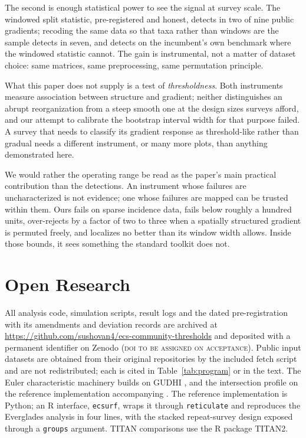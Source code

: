 \documentclass[review,12pt,authoryear]{elsarticle}
\theoremstyle{remark}
\begin{document}
The second is enough statistical power to see the signal at survey scale.
The windowed split statistic, pre-registered and honest, detects in two of
nine public gradients; recoding the same data so that taxa rather than
windows are the sample detects in seven, and detects on the incumbent's own
benchmark where the windowed statistic cannot. The gain is instrumental, not
a matter of dataset choice: same matrices, same preprocessing, same
permutation principle.

What this paper does not supply is a test of \emph{thresholdness}. Both
instruments measure association between structure and gradient; neither
distinguishes an abrupt reorganization from a steep smooth one at the design
sizes surveys afford, and our attempt to calibrate the bootstrap interval
width for that purpose failed. A survey that needs to classify its gradient
response as threshold-like rather than gradual needs a different instrument,
or many more plots, than anything demonstrated here.

We would rather the operating range be read as the paper's main practical
contribution than the detections. An instrument whose failures are
uncharacterized is not evidence; one whose failures are mapped can be
trusted within them. Ours fails on sparse incidence data, fails below
roughly a hundred units, over-rejects by a factor of two to three when a spatially
structured gradient is permuted freely, and localizes no better than its window width
allows. Inside those bounds, it sees something the standard toolkit does
not.

\section{Open Research}
\label{sec:avail}

All analysis code, simulation scripts, result logs and the dated
pre-registration with its amendments and deviation records are archived at
\url{https://github.com/sushovan4/ecs-community-thresholds} and deposited
with a permanent identifier on Zenodo (\textsc{doi to be assigned on
acceptance}). Public input datasets are obtained from their original
repositories by the included fetch script and are not redistributed; each is
cited in Table~\ref{tab:program} or in the text. The Euler characteristic
machinery builds on GUDHI \citep{maria2014gudhi}, and the intersection
profile on the reference implementation accompanying
\citet{kawamura2026intersection}. The reference implementation is Python; an
R interface, \texttt{ecsurf}, wraps it through \texttt{reticulate} and
reproduces the Everglades analysis in four lines, with the stacked
repeat-survey design exposed through a \texttt{groups} argument. TITAN
comparisons use the R package TITAN2.
\end{document}
